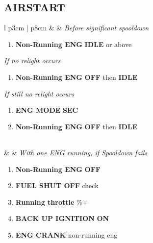 \documentclass[8pt,usenames,dvipsnames,twoside]{article}
\begin{document}
	\clearpage

	\subsection{AIRSTART}
	\begin{center}
		\begin{longtable}{l p{3cm} | p{8cm}}
			\toprule
			\textbullet &  & \emph{Before significant spooldown}
			\begin{minipage}[t]{\linewidth}
				\vspace{-7pt}
				\begin{enumerate}
					\item \textbf{Non-Running ENG} \dotfill \textbf{IDLE} or above
				\end{enumerate}
				\vspace{7pt}
				\emph{If no relight occurs}
				\begin{enumerate}[label=(\alph*), resume]
					\vspace{-7pt}
					\item \textbf{Non-Running ENG} \dotfill \textbf{OFF} then \textbf{IDLE}
				\end{enumerate}
				\vspace{-7pt}
				\emph{If still no relight occurs}
				\begin{enumerate}[label=(\alph*), resume]
					\vspace{-7pt}
					\item \textbf{ENG MODE} \dotfill \textbf{SEC}
					\item \textbf{Non-Running ENG} \dotfill \textbf{OFF} then \textbf{IDLE}
				\end{enumerate}
			\end{minipage} \\
			\midrule
			\textbullet &  &
			\emph{With one ENG running, if Spooldown fails}
			\begin{minipage}[t]{\linewidth}
				\vspace{-7pt}
				\begin{enumerate}
					\item \textbf{Non-Running ENG} \dotfill \textbf{OFF}
					\item \textbf{FUEL SHUT OFF} \dotfill check
					\item \textbf{Running throttle} \%+
					\item \textbf{BACK UP IGNITION} \dotfill \textbf{ON}
					\item \textbf{ENG CRANK} \dotfill non-running eng

\end{enumerate}
\end{minipage}
\end{longtable}
\end{center}
\end{document}
